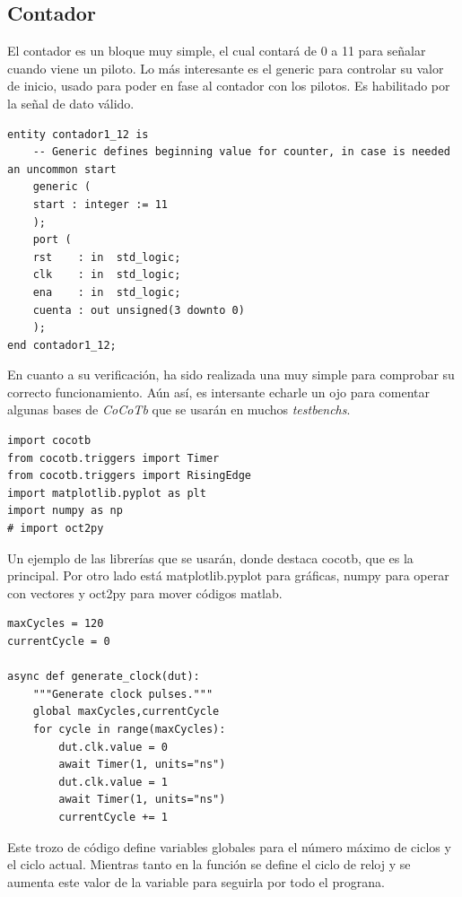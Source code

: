 \documentclass[11pt]{scrartcl} %
\begin{document}
\begin{preview}
\subsection{Contador}

El contador es un bloque muy simple, el cual contará de 0 a 11 para señalar cuando viene un piloto. Lo más interesante es el generic para controlar su valor de inicio, usado para poder en fase al contador con los pilotos. Es habilitado por la señal de dato válido.

\begin{verbatim}
entity contador1_12 is
	-- Generic defines beginning value for counter, in case is needed an uncommon start
	generic (
	start : integer := 11
	);
	port (
	rst    : in  std_logic;
	clk    : in  std_logic;
	ena    : in  std_logic;
	cuenta : out unsigned(3 downto 0)
	);
end contador1_12;
\end{verbatim}

En cuanto a su verificación, ha sido realizada una muy simple para comprobar su correcto funcionamiento. Aún así, es intersante echarle un ojo para comentar algunas bases de \emph{CoCoTb} que se usarán en muchos \emph{testbenchs}.

\begin{verbatim}
import cocotb
from cocotb.triggers import Timer
from cocotb.triggers import RisingEdge
import matplotlib.pyplot as plt
import numpy as np
# import oct2py
\end{verbatim}

Un ejemplo de las librerías que se usarán, donde destaca cocotb, que es la principal. Por otro lado está matplotlib.pyplot para gráficas, numpy para operar con vectores y oct2py para mover códigos matlab.

\begin{verbatim}
maxCycles = 120
currentCycle = 0

async def generate_clock(dut):
    """Generate clock pulses."""
    global maxCycles,currentCycle
    for cycle in range(maxCycles):
        dut.clk.value = 0
        await Timer(1, units="ns")
        dut.clk.value = 1
        await Timer(1, units="ns")
        currentCycle += 1
\end{verbatim}

Este trozo de código define variables globales para el número máximo de ciclos y el ciclo actual. Mientras tanto en la función se define el ciclo de reloj y se aumenta este valor de la variable para seguirla por todo el prograna.


\end{preview}
\end{document}

